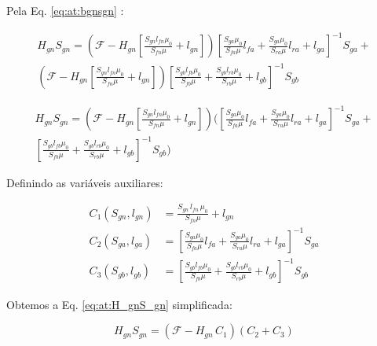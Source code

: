 Pela Eq. \eqref{eq:at:bgnsgn} :

\begin{multline*}
		H_{gn} S_{gn} =  
		\left(
			 	\mathcal{F} -
			 	H_{gn} \left[
			 				\frac{S_{gn} l_{fn} \mu_0}{S_{fn} \mu}  + l_{gn}
			 			\right] 
		 	\right)
		 	\left[ 
		 		   	\frac{S_{ga} \mu_0}{S_{fa} \mu} l_{fa} +  
		 		   	\frac{S_{ga} \mu_0}{S_{ra} \mu} l_{ra} +
		 		   	l_{ga}
		 	\right]^{-1}  S_{ga} 
		 	+ \\
			\left(
			 	\mathcal{F} -
			 	H_{gn} \left[
			 				\frac{S_{gn} l_{fn} \mu_0}{S_{fn} \mu}  + l_{gn}
			 			\right] 
		 	\right)
		 	\left[ 
		 		   	\frac{S_{gb} l_{fb} \mu_0}{S_{fb} \mu}  +  
		 		   	\frac{S_{gb} l_{rb} \mu_0}{S_{rb} \mu}  +
		 		   	l_{gb}
		 	\right]^{-1} S_{gb} 
\end{multline*}

\begin{multline}
		H_{gn} S_{gn} =  
		\left(
			 	\mathcal{F} -
			 	H_{gn} \left[
			 				\frac{S_{gn} l_{fn} \mu_0}{S_{fn} \mu}  + l_{gn}
			 			\right] 
		 \right)
		 (
			\left[ 
				   	\frac{S_{ga} \mu_0}{S_{fa} \mu} l_{fa} +  
				   	\frac{S_{ga} \mu_0}{S_{ra} \mu} l_{ra} +
				   	l_{ga}
			\right]^{-1}  S_{ga} 
				 	+ \\
			\left[ 
			 		\frac{S_{gb} l_{fb} \mu_0}{S_{fb} \mu}  +  
			 		\frac{S_{gb} l_{rb} \mu_0}{S_{rb} \mu}  +
			 		l_{gb}
			\right]^{-1} S_{gb} 	\label{eq:at:H_gnS_gn}		 	
		 )
\end{multline}

Definindo as variáveis auxiliares:

\begin{align}
	C_1(S_{gn}, l_{gn}) &= 	\frac{S_{gn} \, l_{fn} \, \mu_0}{S_{fn} \mu}  + l_{gn} \\
	C_2(S_{ga}, l_{ga}) &= 	\left[ 
							   	\frac{S_{ga} \mu_0}{S_{fa} \mu} l_{fa} +  
							   	\frac{S_{ga} \mu_0}{S_{ra} \mu} l_{ra} +
							   	l_{ga}
							\right]^{-1}  S_{ga} \\
	C_3(S_{gb}, l_{gb}) &= 	\left[ 
						 		\frac{S_{gb} l_{fb} \mu_0}{S_{fb} \mu}  +  
						 		\frac{S_{gb} l_{rb} \mu_0}{S_{rb} \mu}  +
						 		l_{gb}
							\right]^{-1} S_{gb} 	
\end{align}

Obtemos a Eq. \ref{eq:at:H_gnS_gn} simplificada:

\begin{equation}
	H_{gn} S_{gn} = \left(
							\mathcal{F} - H_{gn}\, C_1
					\right)
					\left(
						C_2 + C_3					
					\right)
\end{equation}

